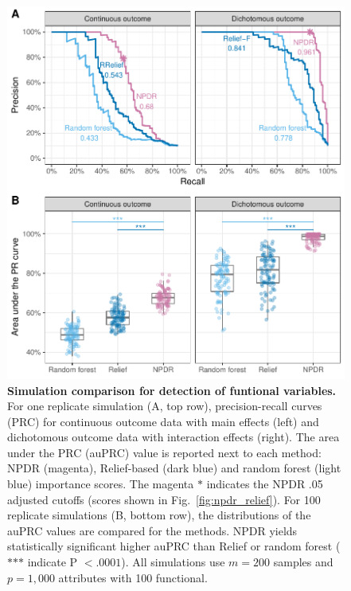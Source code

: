 \documentclass[10pt]{article}
\begin{document}
\begin{figure}[!tbp]
\centerline{\includegraphics[trim = 0 0 0 0]{../figs/fig2_pr_plots.pdf}}
\caption{{\bf Simulation comparison for detection of funtional variables.} For one replicate simulation (A, top row), precision-recall curves (PRC) for continuous outcome data with main effects (left) and dichotomous outcome data with interaction effects (right). The area under the PRC (auPRC) value is reported next to each method: NPDR (magenta), Relief-based (dark blue) and random forest (light blue) importance scores. The magenta $\ast$ indicates the NPDR .05 adjusted cutoffs (scores shown in Fig.~\ref{fig:npdr_relief}). For 100 replicate simulations (B, bottom row), the distributions of the auPRC values are compared for the methods. NPDR yields statistically significant higher auPRC than Relief or random forest ($\ast$$\ast$$\ast$ indicate P $<.0001$). All simulations use $m = 200$ samples and $p = 1,000$ attributes with 100 functional. }
\label{fig:pr_curve}
\end{figure}
\end{document}
